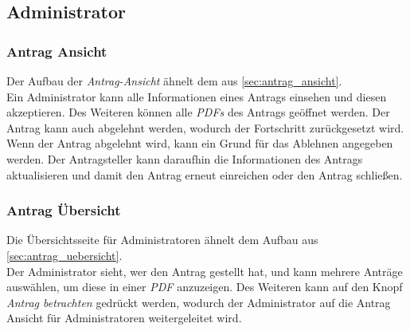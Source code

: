 \subsection{Administrator}
\subsubsection{Antrag Ansicht}
Der Aufbau der \textit{Antrag-Ansicht} ähnelt dem aus \autoref{sec:antrag_ansicht}.\\
Ein Administrator kann alle Informationen eines Antrags einsehen und diesen akzeptieren. Des Weiteren können alle \textit{PDFs} des Antrags geöffnet werden. Der Antrag kann auch abgelehnt werden, wodurch der Fortschritt zurückgesetzt wird. Wenn der Antrag abgelehnt wird, kann ein Grund für das Ablehnen angegeben werden. Der Antragsteller kann daraufhin die Informationen des Antrags aktualisieren und damit den Antrag erneut einreichen oder den Antrag schließen.
\subsubsection{Antrag Übersicht}
Die Übersichtsseite für Administratoren ähnelt dem Aufbau aus \autoref{sec:antrag_uebersicht}.\\
Der Administrator sieht, wer den Antrag gestellt hat, und kann mehrere Anträge auswählen, um diese in einer \textit{PDF} anzuzeigen.
Des Weiteren kann auf den Knopf \textit{Antrag betrachten} gedrückt werden, wodurch der Administrator auf die Antrag Ansicht für Administratoren weitergeleitet wird.
\newpage
